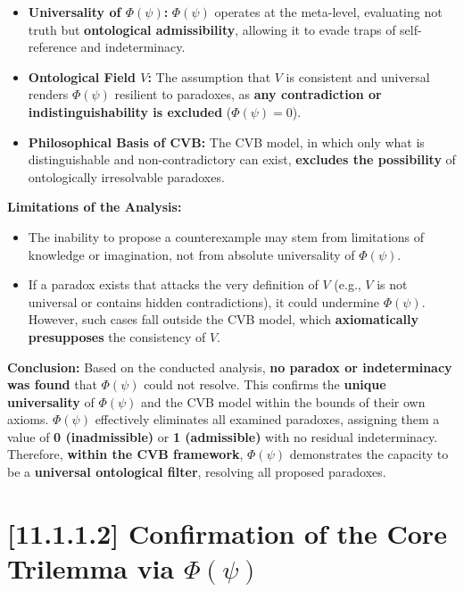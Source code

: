 \documentclass[12pt]{article}
\begin{document}
\begin{itemize}
\item \textbf{Universality of $\Phi(\psi)$:}  
$\Phi(\psi)$ operates at the meta-level, evaluating not truth but \textbf{ontological admissibility}, allowing it to evade traps of self-reference and indeterminacy.

\item \textbf{Ontological Field $V$:}  
The assumption that $V$ is consistent and universal renders $\Phi(\psi)$ resilient to paradoxes, as \textbf{any contradiction or indistinguishability is excluded} ($\Phi(\psi) = 0$).

\item \textbf{Philosophical Basis of CVB:}  
The CVB model, in which only what is distinguishable and non-contradictory can exist, \textbf{excludes the possibility} of ontologically irresolvable paradoxes.
\end{itemize}

\textbf{Limitations of the Analysis:}

\begin{itemize}
\item The inability to propose a counterexample may stem from limitations of knowledge or imagination, not from absolute universality of $\Phi(\psi)$.
\item If a paradox exists that attacks the very definition of $V$ (e.g., $V$ is not universal or contains hidden contradictions), it could undermine $\Phi(\psi)$.  
However, such cases fall outside the CVB model, which \textbf{axiomatically presupposes} the consistency of $V$.
\end{itemize}

\textbf{Conclusion:}  
Based on the conducted analysis, \textbf{no paradox or indeterminacy was found} that $\Phi(\psi)$ could not resolve.  
This confirms the \textbf{unique universality} of $\Phi(\psi)$ and the CVB model within the bounds of their own axioms.  
$\Phi(\psi)$ effectively eliminates all examined paradoxes, assigning them a value of \textbf{0 (inadmissible)} or \textbf{1 (admissible)} with no residual indeterminacy.  
Therefore, \textbf{within the CVB framework}, $\Phi(\psi)$ demonstrates the capacity to be a \textbf{universal ontological filter}, resolving all proposed paradoxes.


\section*{[11.1.1.2] Confirmation of the Core Trilemma via $\Phi(\psi)$}
\end{document}
